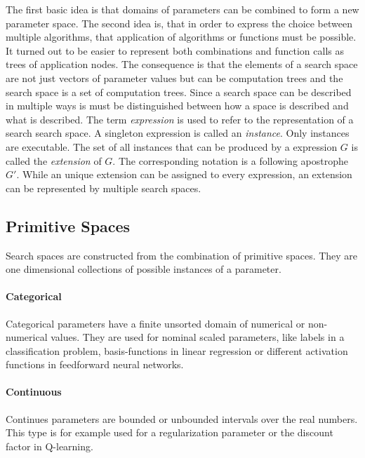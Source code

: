 \documentclass[english]{article}
\begin{document}
The first basic idea is that domains of parameters can be combined to form a new parameter space. The second idea is, that in order to express the choice between multiple algorithms, that application of algorithms or functions must be possible. It turned out to be easier to represent both combinations and function calls as trees of application nodes.
The consequence is that the elements of a search space are not just vectors of parameter values but can be computation trees and the search space is a set of computation trees.
Since a search space can be described in multiple ways is must be distinguished between how a space is described and what is described. The term \textit{expression} is used to refer to the representation of a search search space. A singleton expression is called an \textit{instance}. Only instances are executable. The set of all instances that can be produced by a expression $G$ is called the \textit{extension} of $G$. The corresponding notation is a following apostrophe $G'$. While an unique extension can be assigned to every expression, an extension can be represented by multiple search spaces.

\subsection{Primitive Spaces}

Search spaces are constructed from the combination of primitive spaces. They are one dimensional collections of possible instances of a parameter.


\paragraph{Categorical}
Categorical parameters have a finite unsorted domain of numerical or non-numerical values. They are used for nominal scaled parameters, like labels in a classification problem, basis-functions in linear regression or different activation functions in feedforward neural networks.

\paragraph{Continuous}
Continues parameters are bounded or unbounded intervals over the real numbers. This type is for example used for a regularization parameter or the discount factor in Q-learning.
\end{document}
